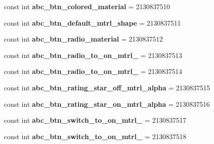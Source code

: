 \begin{DoxyCompactItemize}
const int {\bfseries abc\+\_\+btn\+\_\+colored\+\_\+material} = 2130837510
\item 
\mbox{\label{classXaria_1_1Resource_1_1Drawable_a875008fc3909cf729afb8417985c74cb}} 
const int {\bfseries abc\+\_\+btn\+\_\+default\+\_\+mtrl\+\_\+shape} = 2130837511
\item 
\mbox{\label{classXaria_1_1Resource_1_1Drawable_a3f85070407c0cd3e7517d565e714f556}} 
const int {\bfseries abc\+\_\+btn\+\_\+radio\+\_\+material} = 2130837512
\item 
\mbox{\label{classXaria_1_1Resource_1_1Drawable_a998a5865ab9e90e52777f9cd76d31984}} 
const int {\bfseries abc\+\_\+btn\+\_\+radio\+\_\+to\+\_\+on\+\_\+mtrl\+\_} = 2130837513
\item 
\mbox{\label{classXaria_1_1Resource_1_1Drawable_a817038365169150039e3883761107a26}} 
const int {\bfseries abc\+\_\+btn\+\_\+radio\+\_\+to\+\_\+on\+\_\+mtrl\+\_} = 2130837514
\item 
\mbox{\label{classXaria_1_1Resource_1_1Drawable_a7287f9ba6275226e33c9e62782262fdc}} 
const int {\bfseries abc\+\_\+btn\+\_\+rating\+\_\+star\+\_\+off\+\_\+mtrl\+\_\+alpha} = 2130837515
\item 
\mbox{\label{classXaria_1_1Resource_1_1Drawable_a3fb6afb518ef90871d136d3fd865d6f5}} 
const int {\bfseries abc\+\_\+btn\+\_\+rating\+\_\+star\+\_\+on\+\_\+mtrl\+\_\+alpha} = 2130837516
\item 
\mbox{\label{classXaria_1_1Resource_1_1Drawable_ab11cce99c120f862c3f85216b1440d93}} 
const int {\bfseries abc\+\_\+btn\+\_\+switch\+\_\+to\+\_\+on\+\_\+mtrl\+\_} = 2130837517
\item 
\mbox{\label{classXaria_1_1Resource_1_1Drawable_ab718387ca83f99869f70cf3fa97a22f5}} 
const int {\bfseries abc\+\_\+btn\+\_\+switch\+\_\+to\+\_\+on\+\_\+mtrl\+\_} = 2130837518
\item 
\mbox{\label{classXaria_1_1Resource_1_1Drawable_a317e175f050af76952b5de31a1d72972}} 

\end{DoxyCompactItemize}
